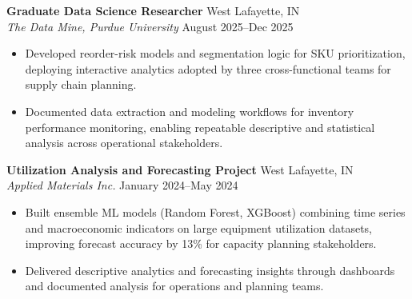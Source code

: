 \documentclass[11pt,a4paper]{article}
\begin{document}
\noindent
\textbf{Graduate Data Science Researcher} \hfill West Lafayette, IN \\
\textit{The Data Mine, Purdue University} \hfill August 2025--Dec 2025
\begin{itemize}[leftmargin=*, noitemsep, topsep=0pt]
    \item Developed reorder-risk models and segmentation logic for SKU prioritization, deploying interactive analytics adopted by three cross-functional teams for supply chain planning.
    \item Documented data extraction and modeling workflows for inventory performance monitoring, enabling repeatable descriptive and statistical analysis across operational stakeholders.
\end{itemize}
\vspace{6pt}

\noindent
\textbf{Utilization Analysis and Forecasting Project} \hfill West Lafayette, IN \\
\textit{Applied Materials Inc.} \hfill January 2024--May 2024
\begin{itemize}[leftmargin=*, noitemsep, topsep=0pt]
    \item Built ensemble ML models (Random Forest, XGBoost) combining time series and macroeconomic indicators on large equipment utilization datasets, improving forecast accuracy by 13\% for capacity planning stakeholders.
    \item Delivered descriptive analytics and forecasting insights through dashboards and documented analysis for operations and planning teams.
\end{itemize}
\end{document}
